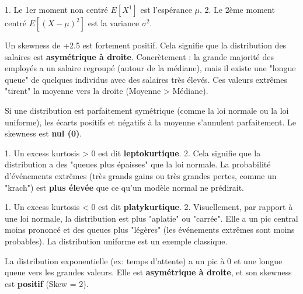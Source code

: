 \begin{correctionbox}
1.  Le 1er moment non centré $E[X^1]$ est l'espérance $\mu$.
2.  Le 2ème moment centré $E[(X-\mu)^2]$ est la variance $\sigma^2$.
\end{correctionbox}

\begin{correctionbox}
Un skewness de +2.5 est fortement positif. Cela signifie que la distribution des salaires est \textbf{asymétrique à droite}.
Concrètement : la grande majorité des employés a un salaire regroupé (autour de la médiane), mais il existe une "longue queue" de quelques individus avec des salaires très élevés. Ces valeurs extrêmes "tirent" la moyenne vers la droite (Moyenne > Médiane).
\end{correctionbox}

\begin{correctionbox}
Si une distribution est parfaitement symétrique (comme la loi normale ou la loi uniforme), les écarts positifs et négatifs à la moyenne s'annulent parfaitement. Le skewness est \textbf{nul (0)}.
\end{correctionbox}

\begin{correctionbox}
1.  Un excess kurtosis > 0 est dit \textbf{leptokurtique}.
2.  Cela signifie que la distribution a des "queues plus épaisses" que la loi normale. La probabilité d'événements extrêmes (très grands gains ou très grandes pertes, comme un "krach") est \textbf{plus élevée} que ce qu'un modèle normal ne prédirait.
\end{correctionbox}

\begin{correctionbox}
1.  Un excess kurtosis < 0 est dit \textbf{platykurtique}.
2.  Visuellement, par rapport à une loi normale, la distribution est plus "aplatie" ou "carrée". Elle a un pic central moins prononcé et des queues plus "légères" (les événements extrêmes sont moins probables). La distribution uniforme est un exemple classique.
\end{correctionbox}

\begin{correctionbox}
La distribution exponentielle (ex: temps d'attente) a un pic à 0 et une longue queue vers les grandes valeurs. Elle est \textbf{asymétrique à droite}, et son skewness est \textbf{positif} (Skew = 2).
\end{correctionbox}

